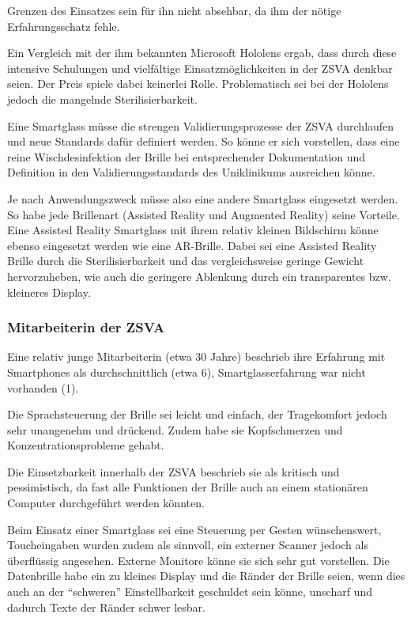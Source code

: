 Grenzen des Einsatzes sein für ihn nicht absehbar, da ihm der nötige Erfahrungsschatz fehle.

Ein Vergleich mit der ihm bekannten Microsoft Hololens ergab, dass durch diese intensive Schulungen und vielfältige Einsatzmöglichkeiten in der ZSVA denkbar seien. Der Preis spiele dabei keinerlei Rolle. Problematisch sei bei der Hololens jedoch die mangelnde Sterilisierbarkeit.

Eine Smartglass müsse die strengen Validierungsprozesse der ZSVA durchlaufen und neue Standards dafür definiert werden. So könne er sich vorstellen, dass eine reine Wischdesinfektion der Brille bei entsprechender Dokumentation und Definition in den Validierungsstandards des Uniklinikums ausreichen könne.

Je nach Anwendungszweck müsse also eine andere Smartglass eingesetzt werden. So habe jede Brillenart (Assisted Reality und Augmented Reality) seine Vorteile. Eine Assisted Reality Smartglass mit ihrem relativ kleinen Bildschirm könne ebenso eingesetzt werden wie eine AR-Brille. Dabei sei eine Assisted Reality Brille durch die Sterilisierbarkeit und das vergleichsweise geringe Gewicht hervorzuheben, wie auch die geringere Ablenkung durch ein transparentes bzw. kleineres Display.
%
%
\subsubsection{Mitarbeiterin der ZSVA}
%
Eine relativ junge Mitarbeiterin (etwa 30 Jahre) beschrieb ihre Erfahrung mit Smartphones als durchschnittlich (etwa 6), Smartglasserfahrung war nicht vorhanden (1).

Die Sprachsteuerung der Brille sei leicht und einfach, der Tragekomfort jedoch sehr unangenehm und drückend. Zudem habe sie Kopfschmerzen und Konzentrationsprobleme gehabt.

Die Einsetzbarkeit innerhalb der ZSVA beschrieb sie als kritisch und pessimistisch, da fast alle Funktionen der Brille auch an einem stationären Computer durchgeführt werden könnten. 

Beim Einsatz einer Smartglass sei eine Steuerung per Gesten wünschenswert, Toucheingaben wurden zudem als sinnvoll, ein externer Scanner jedoch als überflüssig angesehen. Externe Monitore könne sie sich sehr gut vorstellen. Die Datenbrille habe ein zu kleines Display und die Ränder der Brille seien, wenn dies auch an der \enquote{schweren} Einstellbarkeit geschuldet sein könne, unscharf und dadurch Texte der Ränder schwer lesbar.

